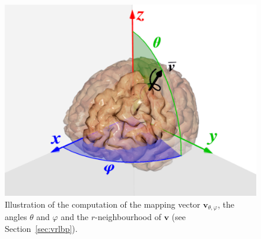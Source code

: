 \begin{figure}[htp]
	\centering
	\includegraphics[width=0.8\columnwidth]{Graphics/ch6/02-projection}
	\caption{Illustration of the computation of the mapping vector $\mathbf{v}_{\theta,\varphi}$, the angles $\theta$ and $\varphi$ and the $r$-neighbourhood of $\mathbf{v}$ (see Section~\ref{sec:vrlbp}).}
	\label{fig:brainmapping}
\end{figure}

